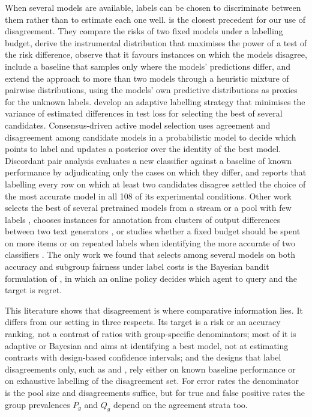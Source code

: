 \documentclass[pdflatex,sn-mathphys-num,iicol]{sn-jnl}
\theoremstyle{thmstyleone}
\theoremstyle{thmstyletwo}
\theoremstyle{thmstylethree}
\begin{document}
When several models are available, labels can be chosen to discriminate between them rather than to estimate each one well. \citet{sawade2012active} is the closest precedent for our use of disagreement. They compare the risks of two fixed models under a labelling budget, derive the instrumental distribution that maximises the power of a test of the risk difference, observe that it favours instances on which the models disagree, include a baseline that samples only where the models' predictions differ, and extend the approach to more than two models through a heuristic mixture of pairwise distributions, using the models' own predictive distributions as proxies for the unknown labels. \citet{hara2024} develop an adaptive labelling strategy that minimises the variance of estimated differences in test loss for selecting the best of several candidates. Consensus-driven active model selection \citep{kay2025coda} uses agreement and disagreement among candidate models in a probabilistic model to decide which points to label and updates a posterior over the identity of the best model. Discordant pair analysis \citep{musgrove2023discordant} evaluates a new classifier against a baseline of known performance by adjudicating only the cases on which they differ, and \citet{kuboyama2026} reports that labelling every row on which at least two candidates disagree settled the choice of the most accurate model in all 108 of its experimental conditions. Other work selects the best of several pretrained models from a stream or a pool with few labels \citep{karimi2021,okanovic2025}, chooses instances for annotation from clusters of output differences between two text generators \citep{ashurytahan2024}, or studies whether a fixed budget should be spent on more items or on repeated labels when identifying the more accurate of two classifiers \citep{dorner2024}. The only work we found that selects among several models on both accuracy and subgroup fairness under label costs is the Bayesian bandit formulation of \citet{kher2026}, in which an online policy decides which agent to query and the target is regret.

This literature shows that disagreement is where comparative information lies. It differs from our setting in three respects. Its target is a risk or an accuracy ranking, not a contrast of ratios with group-specific denominators; most of it is adaptive or Bayesian and aims at identifying a best model, not at estimating contrasts with design-based confidence intervals; and the designs that label disagreements only, such as \citet{musgrove2023discordant} and \citet{kuboyama2026}, rely either on known baseline performance or on exhaustive labelling of the disagreement set. For error rates the denominator is the pool size and disagreements suffice, but for true and false positive rates the group prevalences $P_g$ and $Q_g$ depend on the agreement strata too.
\end{document}
